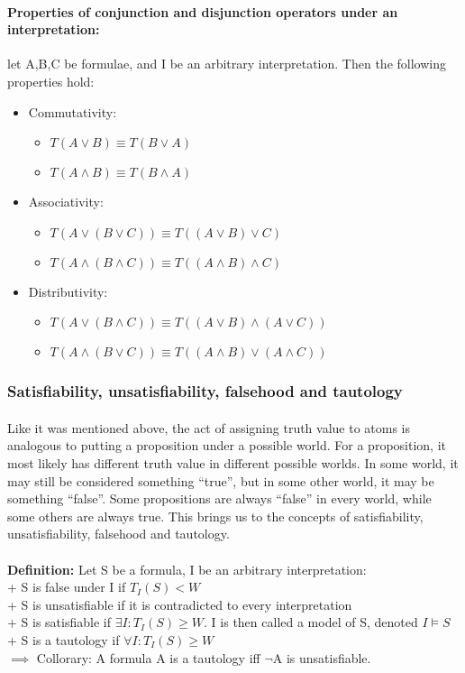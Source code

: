 \documentclass[part1.tex]{subfiles}
\begin{document}
\paragraph{Properties of conjunction and disjunction operators
under an interpretation:} let A,B,C be formulae, and I be an
arbitrary interpretation. Then the following properties hold:
\begin{itemize}
\item Commutativity:
  \begin{itemize}
    \item $T(A \vee B) \equiv T(B \vee A)$
    \item $T(A \wedge B) \equiv T(B \wedge A)$
  \end{itemize}
\item Associativity:
  \begin{itemize}
    \item $T(A \vee (B \vee C)) \equiv T((A \vee B) \vee C)$
    \item $T(A \wedge (B \wedge C)) \equiv T((A \wedge B) \wedge C)$
  \end{itemize}
\item Distributivity:
  \begin{itemize}
    \item $T(A \vee (B \wedge C)) \equiv T((A \vee B) \wedge (A \vee
      C))$
    \item $T(A \wedge (B \vee C)) \equiv T((A \wedge B) \vee (A \wedge
      C))$
  \end{itemize}
\end{itemize}
\subsubsection{Satisfiability, unsatisfiability, falsehood and
tautology}
\paragraph{} Like it was mentioned above, the act of assigning
truth value to atoms is analogous to putting a proposition under
a possible world. For a proposition, it most likely has different truth
value in different possible worlds. In some world, it may still
be considered something ``true'', but in some other world, it
may be something ``false''. Some propositions are always
``false'' in every world, while some others are always true.
This brings us to the concepts of
satisfiability, unsatisfiability, falsehood and tautology.\\\\
{\bfseries Definition:} Let S be a formula, I be an arbitrary interpretation:\\
\indent + S is false under I if \(T_I(S) < W\)\\
\indent + S is unsatisfiable if it is contradicted to every interpretation\\ 
\indent + S is satisfiable if \(\exists I: T_I(S) \ge W\). I is then called a model of S, denoted \(I \models S\)\\
\indent + S is a tautology if \(\forall I: T_I(S) \ge W\)\\
\indent \(\implies\) Collorary: A formula A is a tautology iff \(\neg\)A is unsatisfiable.
\end{document}

